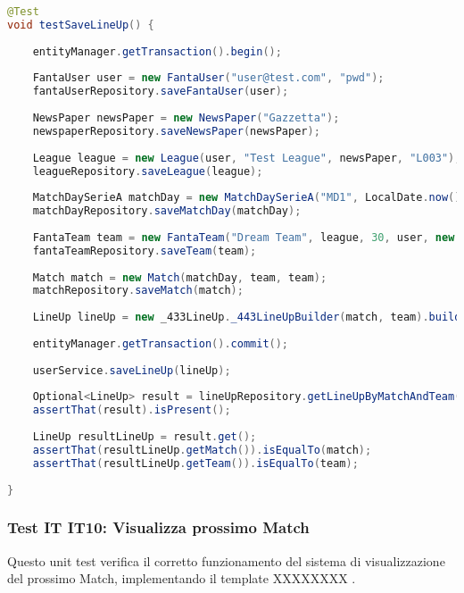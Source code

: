 \begin{lstlisting}[language=Java]
@Test
void testSaveLineUp() {
		
	entityManager.getTransaction().begin();
		
	FantaUser user = new FantaUser("user@test.com", "pwd");
	fantaUserRepository.saveFantaUser(user);
		
	NewsPaper newsPaper = new NewsPaper("Gazzetta");
	newspaperRepository.saveNewsPaper(newsPaper);
		
	League league = new League(user, "Test League", newsPaper, "L003");
	leagueRepository.saveLeague(league);
		
	MatchDaySerieA matchDay = new MatchDaySerieA("MD1", LocalDate.now().plusWeeks(1)); // Monday
	matchDayRepository.saveMatchDay(matchDay);
		
	FantaTeam team = new FantaTeam("Dream Team", league, 30, user, new HashSet<>());
	fantaTeamRepository.saveTeam(team);
		
	Match match = new Match(matchDay, team, team);
	matchRepository.saveMatch(match);
		
	LineUp lineUp = new _433LineUp._443LineUpBuilder(match, team).build();
		
	entityManager.getTransaction().commit();
		
	userService.saveLineUp(lineUp);
		
	Optional<LineUp> result = lineUpRepository.getLineUpByMatchAndTeam(match, team);
	assertThat(result).isPresent();
		
	LineUp resultLineUp = result.get();
	assertThat(resultLineUp.getMatch()).isEqualTo(match);
	assertThat(resultLineUp.getTeam()).isEqualTo(team);
		
}
\end{lstlisting}


\subsubsection{Test IT IT10: Visualizza prossimo Match} \label{IT10}

Questo unit test verifica il corretto funzionamento del sistema di visualizzazione del prossimo Match,
implementando il template XXXXXXXX .

